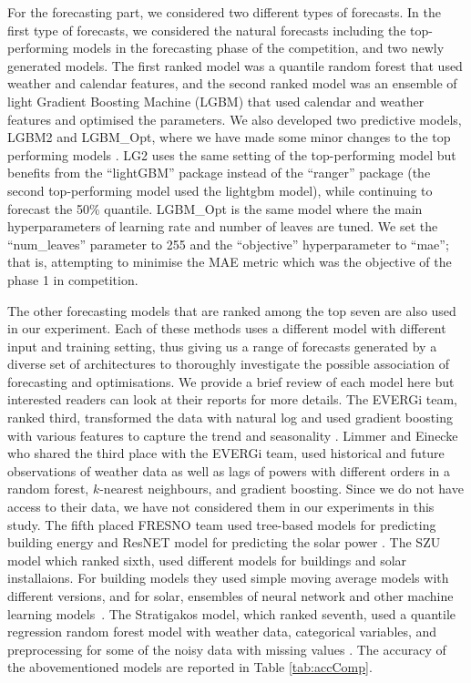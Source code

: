 \documentclass[conference]{IEEEtran}
\begin{document}
For the forecasting part, we considered two different types of forecasts.  
In the first type of forecasts, we considered the natural forecasts including the top-performing models in the forecasting phase of the competition, and two newly generated models. 
The first ranked model was a quantile random forest that used weather and calendar features, and the second ranked model was an ensemble of light Gradient Boosting Machine (LGBM) that used calendar and weather features and optimised the parameters.  We also developed two predictive models, LGBM2 and LGBM\_Opt, where we have made some minor changes to the top performing models \cite{bean2022methodology,abolghasemi2021state}. LG2 uses the same setting of the top-performing model but benefits from the ``lightGBM'' package instead of the ``ranger'' package (the second top-performing model used the lightgbm model), while continuing to forecast the 50\% quantile. LGBM\_Opt is the same model where the main hyperparameters of learning rate and number of leaves are tuned. We set the ``num\_leaves'' parameter to 255 and the ``objective'' hyperparameter to ``mae''; that is, attempting to minimise the MAE metric which was the objective of the phase 1 in competition.

The other forecasting models that are ranked among the top seven are also used in our experiment. Each of these methods uses a different model with different input and training setting, thus giving us a range of forecasts generated by a diverse set of architectures to thoroughly investigate the possible association of forecasting and optimisations. We provide a brief review of each model here but interested readers can look at their reports for more details. 
The EVERGi team, ranked third, transformed the data with natural log and used gradient boosting with various features to capture the trend and seasonality  \cite{evergi}. Limmer and Einecke~\cite{honda} who shared the third place with the EVERGi team, used historical and future observations of weather data as well as lags of powers with different orders in a random forest, $k$-nearest neighbours, and gradient boosting. Since we do not have access to their data, we have not considered them in our experiments in this study.  The fifth placed FRESNO team used tree-based models for predicting building energy and ResNET model for predicting the solar power \cite{yuan2021optimal}. The SZU model which ranked sixth, used different models for buildings and solar installaions. For building models they used simple moving average models with different versions, and for solar, ensembles of neural network and other machine learning models~\cite{szu}.
The Stratigakos model, which ranked seventh,  used a quantile regression random forest model with weather data, categorical variables, and preprocessing for some of the noisy data with missing values  \cite{stratigakos2021robust}. The accuracy of the abovementioned models are reported in Table  \ref{tab:accComp}.
\end{document}
